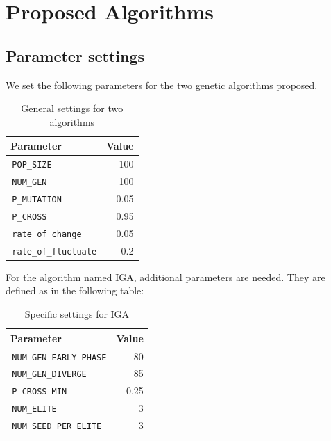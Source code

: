 \documentclass[runningheads]{llncs}
\begin{document}
\section{Proposed Algorithms}
\subsection{Parameter settings}
We set the following parameters for the two genetic algorithms proposed.

\begin{table}[h]
    \centering
    \begin{tabular}{|l|r|} 
        \hline
        \textbf{Parameter} & \textbf{Value} \\ [0.5ex] 
        \hline
        \,\texttt{POP\_SIZE} & 100 \\ 
        \hline
        \,\texttt{NUM\_GEN} & 100 \\
        \hline
        \,\texttt{P\_MUTATION} & 0.05 \\
        \hline
        \,\texttt{P\_CROSS} & 0.95 \\
        \hline
        \,\texttt{rate\_of\_change} & 0.05 \\
        \hline 
        \,\texttt{rate\_of\_fluctuate} & 0.2 \\ 
        \hline
    \end{tabular}
    \caption{General settings for two algorithms} 
\end{table}

For the algorithm named IGA, additional parameters are needed. They are defined as in the following table:
\begin{table}[h]
    \centering
    \begin{tabular}{|l|r|} 
        \hline
        \textbf{Parameter} & \textbf{Value} \\ [0.5ex] 
        \hline
        \,\texttt{NUM\_GEN\_EARLY\_PHASE} & 80 \\ 
        \hline
        \,\texttt{NUM\_GEN\_DIVERGE} & 85 \\ 
        \hline
        \,\texttt{P\_CROSS\_MIN} & 0.25 \\
        \hline
        \,\texttt{NUM\_ELITE} & 3 \\
        \hline
        \,\texttt{NUM\_SEED\_PER\_ELITE} & 3 \\
        \hline
    \end{tabular}
    \caption{Specific settings for IGA} 
\end{table} 
\end{document}
